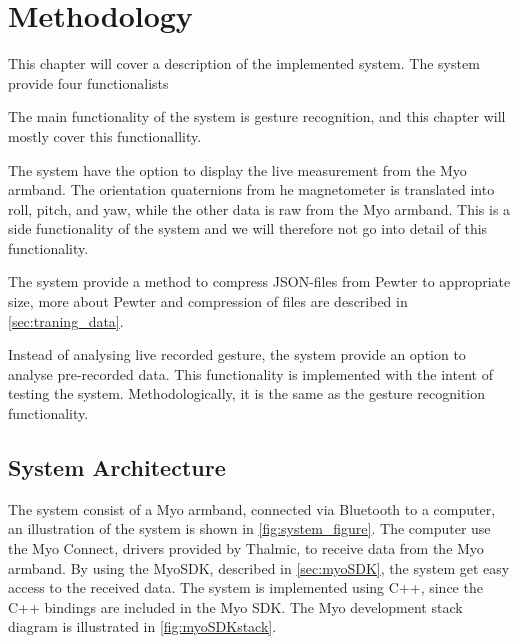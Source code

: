 \chapter{Methodology}
\label{chap:methodology}
This chapter will cover a description of the implemented system. The system provide four functionalists 

\begin{description}[style=nextline]
    \item [Gesture recognition] The main functionality of the system is gesture recognition, and this chapter will mostly cover this functionallity.
    \item [Measurements display] The system have the option to display the live measurement from the Myo armband. The orientation quaternions from he magnetometer is translated into roll, pitch, and yaw, while the other data is raw from the Myo armband. This is a side functionality of the system and we will therefore not go into detail of this functionality.
    \item [Compress files] The system provide a method to compress JSON-files from Pewter to appropriate size, more about Pewter and compression of files are described in \cref{sec:traning_data}.
    \item [Pre-data gesture comparison] Instead of analysing live recorded gesture, the system provide an option to analyse pre-recorded data. This functionality is implemented with the intent of testing the system. Methodologically, it is the same as the gesture recognition functionality.
\end{description}

\section{System Architecture}
The system consist of a Myo armband, connected via Bluetooth to a computer, an illustration of the system is shown in \cref{fig:system_figure}. The computer use the Myo Connect, drivers provided by Thalmic, to receive data from the Myo armband. By using the MyoSDK, described in \cref{sec:myoSDK}, the system get easy access to the received data. The system is implemented using C++, since the C++ bindings are included in the Myo SDK. The Myo development stack diagram is illustrated in \cref{fig:myoSDKstack}.

